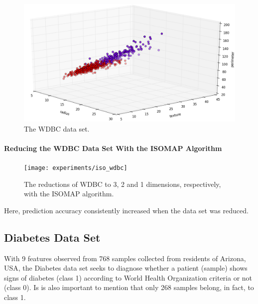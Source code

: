\begin{figure}[H]
	\centering
	\includegraphics[width=\linewidth]{img/datasets/wdbc}
	\captionsetup{justification=centering}
	\caption{The WDBC data set.}
	\label{fig:dswdbc}
\end{figure}

\newpage
\paragraph{Reducing the WDBC Data Set With the ISOMAP Algorithm}

\begin{figure}[H]
	\centering
	\captionsetup{justification=centering}
	\texttt{[image: experiments/iso\_wdbc]}
	\caption{The reductions of WDBC to 3, 2 and 1 dimensions, respectively, with the ISOMAP algorithm.}
	\label{fig:dswdbciso}
\end{figure}

Here, prediction accuracy consistently increased when the data set was reduced.

\newpage
\subsection{Diabetes Data Set}

With 9 features observed from 768 samples collected from residents of Arizona, USA, the Diabetes data set seeks to diagnose whether a patient (sample) shows signs of diabetes (class 1) according to World Health Organization criteria or not (class 0). Is is also important to mention that only 268 samples belong, in fact, to class 1.

